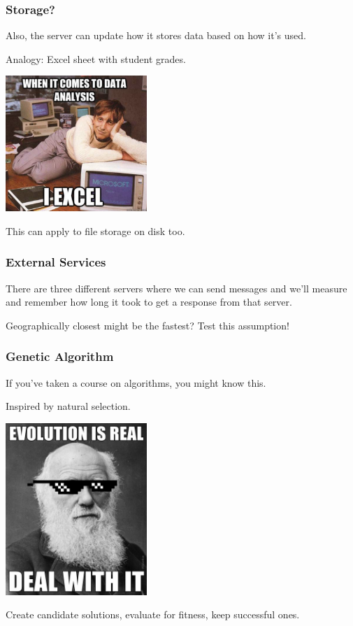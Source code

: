 \begin{frame}
\frametitle{Storage?}

Also, the server can update how it stores data based on how it's used.

Analogy: Excel sheet with student grades.

\begin{center}
	\includegraphics[width=0.4\textwidth]{images/billgates.png}
\end{center}

This can apply to file storage on disk too.

\end{frame}


\begin{frame}
\frametitle{External Services}

There are three different servers where we can send messages and we'll measure and remember how long it took to get a response from that server. 
 
Geographically closest might be the fastest? Test this assumption!

\end{frame}

\begin{frame}
\frametitle{Genetic Algorithm}
If you've taken a course on algorithms, you might know this.

Inspired by natural selection.

\begin{center}
	\includegraphics[width=0.4\textwidth]{images/genetic.jpg}
\end{center}

Create candidate solutions, evaluate for fitness, keep successful ones.

\end{frame}


